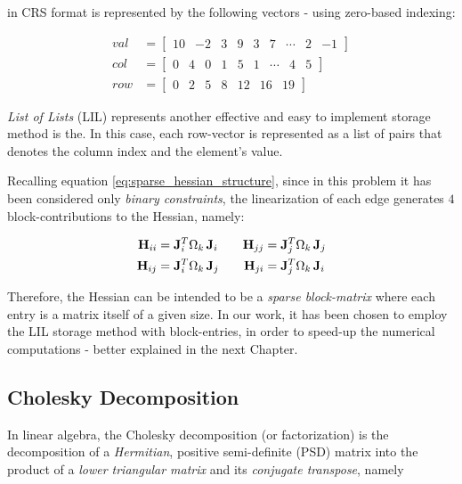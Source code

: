 \noindent in CRS format is represented by the following vectors - using zero-based indexing:

\begin{align*}
    val &= \begin{bmatrix}10 & -2 & 3 & 9 & 3 & 7 & \cdots & 2 & -1\end{bmatrix} \\
    col &= \begin{bmatrix}0 & 4 & 0 & 1 & 5 & 1 & \cdots & 4 & 5\end{bmatrix} \\
    row &= \begin{bmatrix}0 & 2 & 5 & 8 & 12 & 16 & 19\end{bmatrix}     
\end{align*}

\noindent \textit{List of Lists} (LIL) represents another effective and easy to implement storage method is the. In this case, each row-vector is represented as a list of pairs that denotes the column index and the element's value.

Recalling equation \ref{eq:sparse_hessian_structure}, since in this problem it has been considered only \textit{binary constraints}, the linearization of each edge generates $4$ block-contributions to the Hessian, namely:

\begin{align*}
    \mathbf{H}_{ii} &= \mathbf{J}_i^T \Omega_k \, \mathbf{J}_i \qquad
    \mathbf{H}_{jj} = \mathbf{J}_j^T \Omega_k \, \mathbf{J}_j \\
    \mathbf{H}_{ij} &= \mathbf{J}_i^T \Omega_k \, \mathbf{J}_j \qquad
    \mathbf{H}_{ji} = \mathbf{J}_j^T \Omega_k \, \mathbf{J}_i 
\end{align*}

\noindent Therefore, the Hessian can be intended to be a \textit{sparse block-matrix} where each entry is a matrix itself of a given size. In our work, it has been chosen to employ the LIL storage method with block-entries, in order to speed-up the numerical computations - better explained in the next Chapter.

\subsection{Cholesky Decomposition}\label{subsec:cholesky_dec_general}
In linear algebra, the Cholesky decomposition (or factorization) is the decomposition of a \textit{Hermitian}, positive semi-definite (PSD) matrix into the product of a \textit{lower triangular matrix} and its \textit{conjugate transpose}, namely

